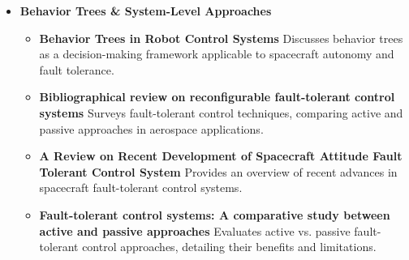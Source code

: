 \begin{itemize}
    \item \textbf{Behavior Trees \& System-Level Approaches}
    \begin{itemize}
        \item \textbf{Behavior Trees in Robot Control Systems} \cite{Ogren2022BehaviorSystems} Discusses behavior trees as a decision-making framework applicable to spacecraft autonomy and fault tolerance.
        \item \textbf{Bibliographical review on reconfigurable fault-tolerant control systems} \cite{Zhang2008BibliographicalSystems} Surveys fault-tolerant control techniques, comparing active and passive approaches in aerospace applications.
        \item \textbf{A Review on Recent Development of Spacecraft Attitude Fault Tolerant Control System} \cite{Yin2016ASystem} Provides an overview of recent advances in spacecraft fault-tolerant control systems.
        \item \textbf{Fault-tolerant control systems: A comparative study between active and passive approaches} \cite{Jiang2012Fault-tolerantApproaches} Evaluates active vs. passive fault-tolerant control approaches, detailing their benefits and limitations.
    \end{itemize}


\end{itemize}
